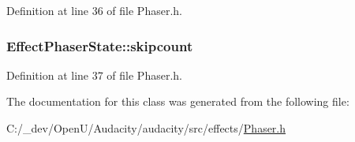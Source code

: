 Definition at line 36 of file Phaser.\+h.

\subsubsection[{\texorpdfstring{skipcount}{skipcount}}]{ Effect\+Phaser\+State\+::skipcount}\hypertarget{class_effect_phaser_state_af2fa2c3e284db5c72a080aaa42e46e03}{}\label{class_effect_phaser_state_af2fa2c3e284db5c72a080aaa42e46e03}


Definition at line 37 of file Phaser.\+h.



The documentation for this class was generated from the following file\+:\begin{DoxyCompactItemize}
\item 
C\+:/\+\_\+dev/\+Open\+U/\+Audacity/audacity/src/effects/\hyperlink{_phaser_8h}{Phaser.\+h}\end{DoxyCompactItemize}
